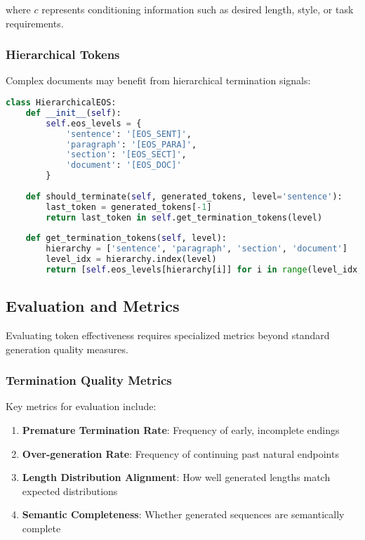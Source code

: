 where $c$ represents conditioning information such as desired length, style, or task requirements.

\subsubsection{Hierarchical \eos{} Tokens}

Complex documents may benefit from hierarchical termination signals:

\begin{lstlisting}[language=Python, caption=Hierarchical EOS for document generation]
class HierarchicalEOS:
    def __init__(self):
        self.eos_levels = {
            'sentence': '[EOS_SENT]',
            'paragraph': '[EOS_PARA]', 
            'section': '[EOS_SECT]',
            'document': '[EOS_DOC]'
        }
    
    def should_terminate(self, generated_tokens, level='sentence'):
        last_token = generated_tokens[-1]
        return last_token in self.get_termination_tokens(level)
    
    def get_termination_tokens(self, level):
        hierarchy = ['sentence', 'paragraph', 'section', 'document']
        level_idx = hierarchy.index(level)
        return [self.eos_levels[hierarchy[i]] for i in range(level_idx, len(hierarchy))]
\end{lstlisting}

\subsection{Evaluation and Metrics}

Evaluating \eos{} token effectiveness requires specialized metrics beyond standard generation quality measures.

\subsubsection{Termination Quality Metrics}

Key metrics for \eos{} evaluation include:

\begin{enumerate}
\item \textbf{Premature Termination Rate}: Frequency of early, incomplete endings
\item \textbf{Over-generation Rate}: Frequency of continuing past natural endpoints
\item \textbf{Length Distribution Alignment}: How well generated lengths match expected distributions
\item \textbf{Semantic Completeness}: Whether generated sequences are semantically complete
\end{enumerate}

